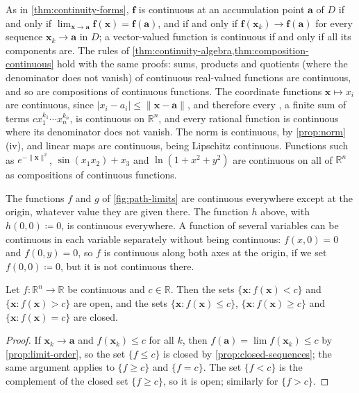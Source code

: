As in \cref{thm:continuity-forms}, $\mathbf f$ is continuous at an accumulation point $\mathbf a$ of $D$ if and only if $\lim_{\mathbf x\to\mathbf a}\mathbf f(\mathbf x)=\mathbf f(\mathbf a)$, and if and only if $\mathbf f(\mathbf x_k)\to\mathbf f(\mathbf a)$ for every sequence $\mathbf x_k\to\mathbf a$ in $D$; a vector-valued function is continuous if and only if all its components are. The rules of \cref{thm:continuity-algebra,thm:composition-continuous} hold with the same proofs: sums, products and quotients (where the denominator does not vanish) of continuous real-valued functions are continuous, and so are compositions of continuous functions. The coordinate functions $\mathbf x\mapsto x_i$ are continuous, since $|x_i-a_i|\le\|\mathbf x-\mathbf a\|$, and therefore every , a finite sum of terms $cx_1^{k_1}\cdots x_n^{k_n}$, is continuous on $\mathbb R^n$, and every rational function is continuous where its denominator does not vanish. The norm is continuous, by \cref{prop:norm}\,(iv), and linear maps are continuous, being Lipschitz continuous. Functions such as $e^{-\|\mathbf x\|^2}$, $\sin(x_1x_2)+x_3$ and $\ln(1+x^2+y^2)$ are continuous on all of $\mathbb R^n$ as compositions of continuous functions.

The functions $f$ and $g$ of \cref{fig:path-limits} are continuous everywhere except at the origin, whatever value they are given there. The function $h$ above, with $h(0,0)\coloneqq0$, is continuous everywhere. A function of several variables can be continuous in each variable separately without being continuous: $f(x,0)=0$ and $f(0,y)=0$, so $f$ is continuous along both axes at the origin, if we set $f(0,0)\coloneqq0$, but it is not continuous there.

\begin{proposition}
\label{prop:level-sets-closed}
Let $f\colon\mathbb R^n\to\mathbb R$ be continuous and $c\in\mathbb R$. Then the sets $\{\mathbf x: f(\mathbf x)<c\}$ and $\{\mathbf x: f(\mathbf x)>c\}$ are open, and the sets $\{\mathbf x: f(\mathbf x)\le c\}$, $\{\mathbf x: f(\mathbf x)\ge c\}$ and $\{\mathbf x: f(\mathbf x)=c\}$ are closed.
\end{proposition}

\begin{proof}
If $\mathbf x_k\to\mathbf a$ and $f(\mathbf x_k)\le c$ for all $k$, then $f(\mathbf a)=\lim f(\mathbf x_k)\le c$ by \cref{prop:limit-order}, so the set $\{f\le c\}$ is closed by \cref{prop:closed-sequences}; the same argument applies to $\{f\ge c\}$ and $\{f=c\}$. The set $\{f<c\}$ is the complement of the closed set $\{f\ge c\}$, so it is open; similarly for $\{f>c\}$.
\end{proof}

